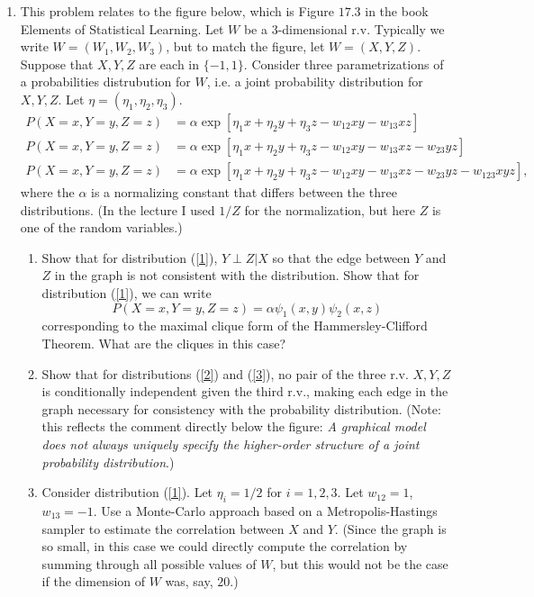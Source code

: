 \documentclass{article}
\begin{document}
\begin{enumerate}
\item This problem relates to the figure below, which is Figure $17.3$ in the book Elements of Statistical Learning.   Let $W$ be a $3$-dimensional r.v.  Typically we write $W = (W_1, W_2, W_3)$, but to match the figure, let $W = (X, Y, Z)$.   Suppose that $X, Y, Z$ are each in $\{-1, 1\}$.   Consider three parametrizations of a probabilities distrubution for $W$, i.e. a joint probability distribution for $X, Y, Z$.   Let $\eta = (\eta_1, \eta_2, \eta_3)$.
\begin{align} \label{1}
P(X=x, Y=y, Z=z) & =\alpha \exp[\eta_1x + \eta_2y + \eta_3z - w_{12} xy - w_{13} xz] \\
\label{2}
P(X=x, Y=y, Z=z) & =\alpha \exp[\eta_1x + \eta_2y + \eta_3z - w_{12} xy - w_{13} xz - w_{23} yz] \\ 
\label{3}
P(X=x, Y=y, Z=z) & = \alpha \exp[\eta_1x + \eta_2y + \eta_3z - w_{12} xy - w_{13} xz - w_{23} yz - w_{123} xyz],
\end{align}
where the $\alpha$ is a normalizing constant that differs between the three distributions. (In the lecture I used $1/Z$ for the normalization, but here $Z$ is one of the random variables.)
\begin{enumerate}
\item Show that for distribution (\ref{1}), $Y \perp Z | X$ so that the edge between $Y$ and $Z$ in the graph is not consistent with the distribution.  Show that for distribution (\ref{1}), we can write
\begin{equation}
P(X=x, Y=y, Z=z) = \alpha \psi_1(x,y) \psi_2(x,z)
\end{equation}
corresponding to the maximal clique form of the Hammersley-Clifford Theorem.  What are the cliques in this case?
\item Show that for distributions (\ref{2}) and (\ref{3}), no pair of the three r.v. $X, Y, Z$ is conditionally independent given the third r.v., making each edge in the graph necessary for consistency with the probability distribution.  (Note: this reflects the comment  directly below the figure: \textit{A graphical model does not always uniquely specify the higher-order structure of a joint probability distribution}.)  
\item Consider distribution (\ref{1}).  Let $\eta_i = 1/2$ for $i=1,2,3$.  Let $w_{12} = 1$, $w_{13} = -1$.  Use a Monte-Carlo approach based on a Metropolis-Hastings sampler to estimate the correlation between $X$ and $Y$.  (Since the graph is so small, in this case we could directly compute the correlation by summing through all possible values of $W$, but this would not be the case if the dimension of $W$ was, say, $20$.)
\end{enumerate}



\end{enumerate}
\end{document}
